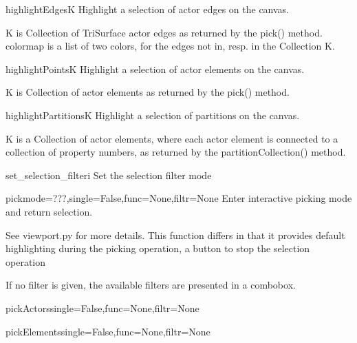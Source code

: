 \begin{funcdesc}{highlightEdges}{K}
Highlight a selection of actor edges on the canvas.

    K is Collection of TriSurface actor edges as returned by the pick() method.
    colormap is a list of two colors, for the edges not in, resp. in
    the Collection K.
    

\end{funcdesc}


\begin{funcdesc}{highlightPoints}{K}
Highlight a selection of actor elements on the canvas.

    K is Collection of actor elements as returned by the pick() method.
    

\end{funcdesc}


\begin{funcdesc}{highlightPartitions}{K}
Highlight a selection of partitions on the canvas.

    K is a Collection of actor elements, where each actor element is
    connected to a collection of property numbers, as returned by the
    partitionCollection() method.
    

\end{funcdesc}


\begin{funcdesc}{set_selection_filter}{i}
Set the selection filter mode

\end{funcdesc}


\begin{funcdesc}{pick}{mode=???,single=False,func=None,filtr=None}
Enter interactive picking mode and return selection.

    See viewport.py for more details.
    This function differs in that it provides default highlighting
    during the picking operation, a button to stop the selection operation

    If no filter is given, the available filters are presented in a combobox.
    

\end{funcdesc}


\begin{funcdesc}{pickActors}{single=False,func=None,filtr=None}


\end{funcdesc}


\begin{funcdesc}{pickElements}{single=False,func=None,filtr=None}


\end{funcdesc}



